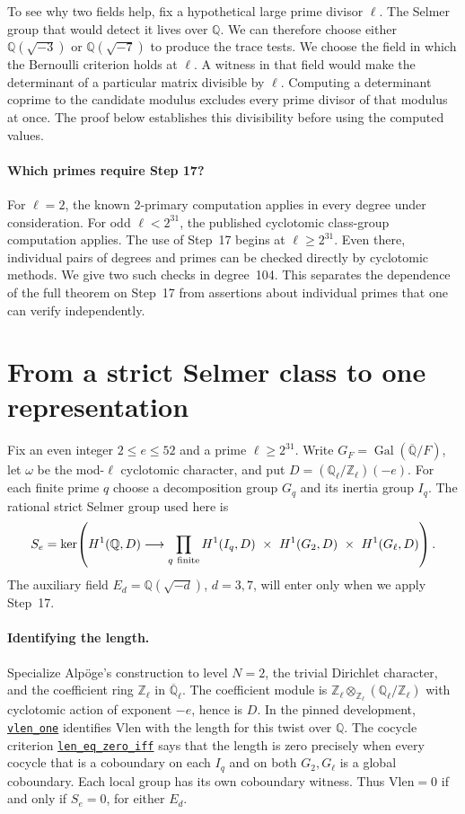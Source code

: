 \documentclass[11pt,a4paper]{article}
\newcommand{\Q}{\mathbb Q}
\newcommand{\Z}{\mathbb Z}
\newcommand{\scl}{https://github.com/CocoSgt/riemann-hypothesis-lean/blob/7cbf7a0c32fca1badf05931879a37c3f8a2b03b4/src/Development/AutomorphicArithmetic/AutomorphicVarieties/SmallClassNumbers}
\begin{document}
To see why two fields help, fix a hypothetical large prime divisor \(\ell\). The Selmer group that would detect it lives over \(\Q\). We can therefore choose either \(\Q(\sqrt{-3})\) or \(\Q(\sqrt{-7})\) to produce the trace tests. We choose the field in which the Bernoulli criterion holds at \(\ell\). A witness in that field would make the determinant of a particular matrix divisible by \(\ell\). Computing a determinant coprime to the candidate modulus excludes every prime divisor of that modulus at once. The proof below establishes this divisibility before using the computed values.

\paragraph{Which primes require Step 17?}
For \(\ell=2\), the known 2-primary computation applies in every degree
under consideration. For odd \(\ell<2^{31}\), the published cyclotomic
class-group computation applies. The use of Step~17 begins at \(\ell\ge2^{31}\).
Even there, individual pairs of degrees and primes can be checked directly
by cyclotomic methods. We give two such checks in degree~104. This
separates the dependence of the full theorem on Step~17 from assertions
about individual primes that one can verify independently.
\newpage

\section{From a strict Selmer class to one representation}
\label{sec:selmer}
Fix an even integer \(2\le e\le52\) and a prime \(\ell\ge2^{31}\).
Write \(G_F=\operatorname{Gal}(\overline{\Q}/F)\), let
\(\omega\) be the mod-\(\ell\) cyclotomic character, and put
\(D=(\Q_\ell/\Z_\ell)(-e)\).
For each finite prime \(q\) choose a decomposition group \(G_q\)
and its inertia group \(I_q\). The rational strict Selmer group used here is
\[
 S_e=\ker\!\left(H^1(\Q,D)\longrightarrow
 \prod_{q\ {\rm finite}}H^1(I_q,D)\ \times\
 H^1(G_2,D)\ \times\ H^1(G_\ell,D)\right).
\]
The auxiliary field \(E_d=\Q(\sqrt{-d})\), \(d=3,7\), will enter only
when we apply Step~17.

\paragraph{Identifying the length.}
Specialize Alpöge's construction to level \(N=2\), the trivial
Dirichlet character, and the coefficient ring \(\Z_\ell\) in
\(\overline{\Q}_\ell\). The coefficient module is
\(\Z_\ell\otimes_{\Z_\ell}(\Q_\ell/\Z_\ell)\) with cyclotomic action
of exponent \(-e\), hence is \(D\). In the pinned development,
\href{\scl/ClassNumberThree.lean\#L13-L30}{\texttt{vlen\_one}}
identifies \(\mathrm{Vlen}\) with the length for this twist over \(\Q\).
The cocycle criterion
\href{\scl/LenEqZeroIff.lean\#L9-L63}{\texttt{len\_eq\_zero\_iff}}
says that the length is zero precisely when every cocycle that is a
coboundary on each \(I_q\) and on both \(G_2,G_\ell\) is a global
coboundary. Each local group has its own coboundary witness.
Thus \(\mathrm{Vlen}=0\) if and only if \(S_e=0\), for either \(E_d\).
\end{document}
